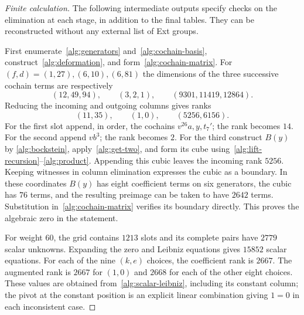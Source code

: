 \begin{proof}[Finite calculation]
The following intermediate outputs specify checks on the elimination
at each stage, in addition to the final tables.  They can be
reconstructed without any external list of Ext groups.

First enumerate~\eqref{alg:generators} and~\eqref{alg:cochain-basis},
construct~\eqref{alg:deformation}, and form~\eqref{alg:cochain-matrix}.
For $(f,d)=(1,27),(6,10),(6,81)$ the dimensions of the three
successive cochain terms are respectively
\[
 (12,49,94),\qquad(3,2,1),\qquad(9301,11419,12864).
\]
Reducing the incoming and outgoing columns gives ranks
\[
 (11,35),\qquad(1,0),\qquad(5256,6156).
\]
For the first slot append, in order, the cochains
$v^{26}a,y,t_7'$; the rank becomes $14$.  For the second append
$vb^3$; the rank becomes $2$.  For the third construct $B(y)$ by
\eqref{alg:bockstein}, apply~\eqref{alg:get-two}, and form its cube
using~\eqref{alg:lift-recursion}--\eqref{alg:product}.  Appending
this cubic leaves the incoming rank $5256$.  Keeping witnesses in
column elimination expresses the cubic as a boundary.  In these
coordinates $B(y)$ has eight coefficient terms on six generators,
the cubic has $76$ terms, and the resulting preimage can be taken to
have $2642$ terms.  Substitution in~\eqref{alg:cochain-matrix} verifies
its boundary directly.  This proves the algebraic zero in the statement.

For weight $60$, the grid contains $1213$ slots and its complete pairs
have $2779$ scalar unknowns.  Expanding the zero and Leibniz equations
gives $15852$ scalar equations.  For each of the nine $(k,e)$ choices,
the coefficient rank is $2667$.  The augmented rank is $2667$ for
$(1,0)$ and $2668$ for each of the other eight choices.  These values
are obtained from~\eqref{alg:scalar-leibniz}, including its constant
column; the pivot at the constant position is an explicit linear
combination giving $1=0$ in each inconsistent case.


\end{proof}
